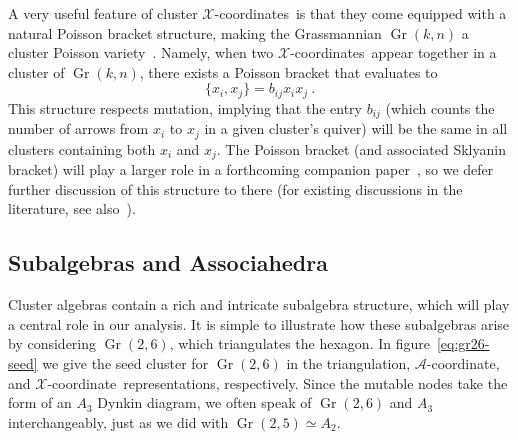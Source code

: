 \documentclass[11pt]{article}
\DeclareMathOperator{\Gr}{Gr}
\def\xcoord{$\mathcal{X}$-coordinate}
\def\xcoords{$\mathcal{X}$-coordinates}
\def\acoord{$\mathcal{A}$-coordinate}
\begin{document}
A very useful feature of cluster \xcoords\ is that they come equipped with a natural Poisson bracket structure, making the Grassmannian $\Gr(k,n)$ a cluster Poisson variety~\cite{}. Namely, when two \xcoords\ appear together in a cluster of $\Gr(k,n)$, there exists a Poisson bracket that evaluates to
\begin{equation}
\{x_i, x_j \} = b_{ij} x_i x_j \ .
\end{equation}
This structure respects mutation, implying that the entry $b_{ij}$ (which counts the number of arrows from $x_i$ to $x_j$ in a given cluster's quiver) will be the same in all clusters containing both $x_i$ and $x_j$. The Poisson bracket (and associated Sklyanin bracket) will play a larger role in a forthcoming companion paper~\cite{cluster_subalgebras_ii}, so we defer further discussion of this structure to there (for existing discussions in the literature, see also~\cite{PoissonVarieties,Vergu:2015svm}).

\subsection{Subalgebras and Associahedra}\label{sec:subalgebras_associahedra}

Cluster algebras contain a rich and intricate subalgebra structure, which will play a central role in our analysis. It is simple to illustrate how these subalgebras arise by considering $\Gr(2,6)$, which triangulates the hexagon. In figure~\ref{eq:gr26-seed} we give the seed cluster for $\Gr(2,6)$ in the triangulation, \acoord, and \xcoord\ representations, respectively. Since the mutable nodes take the form of an $A_3$ Dynkin diagram, we often speak of $\Gr(2,6)$ and $A_3$ interchangeably, just as we did with $\Gr(2,5) \simeq A_2$. 
\end{document}
